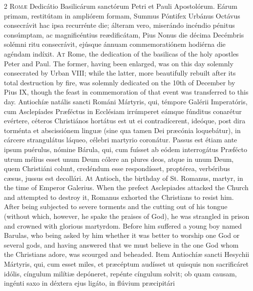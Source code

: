 \begin{paracol}{2}
\lettrine[lines=2]{R}{omæ} Dedicátio 
 Basilicárum sanctórum Petri et Pauli Apostolórum. Eárum primam, 
 restitútam in ampliórem formam, Summus Póntifex Urbánus Octávus consecrávit 
 hac ipsa recurrénte die; álteram vero, miserándo incéndio pénitus consúmptam, 
 ac magnificéntius reædificátam, Pius Nonus die décima Decémbris
 solémni ritu 
 consecrávit, ejúsque ánnuam commemoratiónem hodiérna die agéndam indíxit.
\switchcolumn
{}
\lettrine[lines=2]{A}{t} Rome, the dedication of the 
 basilicas of the holy apostles Peter and Paul. The former, having been 
 enlarged, was on this day solemnly consecrated by Urban VIII; while the 
 latter, more beautifully rebuilt after its total destruction by fire, was 
 solemnly dedicated on the 10th of December by Pius IX, though the feast in 
 commemoration of that event was transferred to this day.
\switchcolumn*
{}
Antiochíæ natális 
 sancti Románi Mártyris, qui, témpore Galérii Imperatóris, cum Asclepíades 
 Præféctus in Ecclésiam irrúmperet eámque fúnditus conarétur evértere, 
 céteros Christiános hortátus est ut ei contradícerent, ideóque, post dira 
 torménta et abscissiónem linguæ (sine qua tamen Dei præcónia loquebátur), in cárcere strangulátus láqueo, célebri martyrio coronátur. Passus est 
 étiam ante ipsum puérulus, nómine Bárula, qui, cum fuísset ab eódem 
 interrogátus Præfécto utrum mélius esset unum Deum cólere an plures deos, 
 atque in unum Deum, quem Christiáni colunt, credéndum esse respondísset, 
 proptérea, verbéribus cæsus, jussus est decollári.
\switchcolumn
{}
At Antioch, the birthday of St. 
 Romanus, martyr, in the time of Emperor Galerius. When the prefect 
 Asclepiades attacked the Church and attempted to destroy it, Romanus 
 exhorted the Christians to resist him. After being subjected to severe 
 torments and the cutting out of his tongue (without which, however, he spake 
 the praises of God), he was strangled in prison and crowned with glorious 
 martyrdom. Before him suffered a young boy named Barulas, who being 
 asked by him whether it was better to worship one God or several gods, and 
 having answered that we must believe in the one God whom the Christians 
 adore, was scourged and beheaded.
\switchcolumn*
{}
Item Antiochíæ sancti 
 Hesychii Mártyris, qui, cum esset miles, et præcéptum audísset ut quisquis 
 non sacrificáret idólis, cíngulum milítiæ depóneret, repénte cíngulum solvit; 
 ob quam causam, ingénti saxo in déxtera ejus ligáto, in flúvium præcipitári 

\end{paracol}
